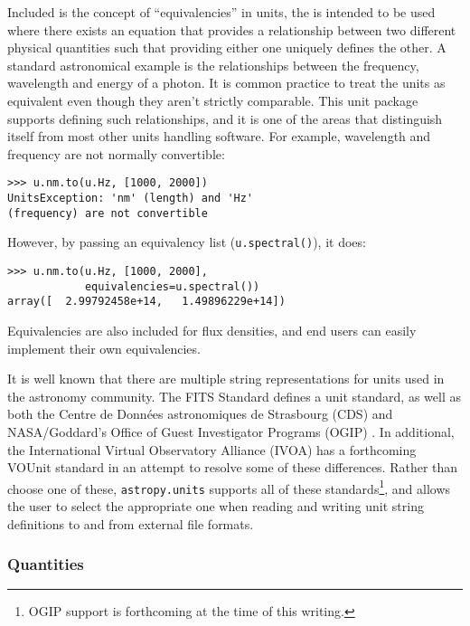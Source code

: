 \documentclass[traditabstract]{aa}
\begin{document}
Included is the concept of ``equivalencies'' in units, the is intended to be
used where there exists an equation that provides a relationship between two
different physical quantities such that providing either one uniquely defines
the other. A standard astronomical example is the relationships between the
frequency, wavelength and energy of a photon. It is common practice to treat
the units as equivalent even though they aren't strictly comparable. This unit
package supports defining such relationships, and it is one of the areas that
distinguish itself from most other units handling software. For example,
wavelength and frequency are not normally convertible:
\begin{verbatim}
>>> u.nm.to(u.Hz, [1000, 2000])
UnitsException: 'nm' (length) and 'Hz'
(frequency) are not convertible
\end{verbatim}
However, by passing an equivalency list (\texttt{u.spectral()}), it
does:
\begin{verbatim}
>>> u.nm.to(u.Hz, [1000, 2000],
            equivalencies=u.spectral())
array([  2.99792458e+14,   1.49896229e+14])
\end{verbatim}
Equivalencies are also included for flux densities, and end users can
easily implement their own equivalencies.


It is well known that there are multiple string representations for
units used in the astronomy community.  The FITS Standard
\cite{fits2008} defines a unit standard, as well as both the Centre de
Donn\'ees astronomiques de Strasbourg (CDS) \citep{ochsenbein2000cds}
and NASA/Goddard's Office of Guest Investigator Programs (OGIP)
\citep{george1995ogip}.  In additional, the International Virtual
Observatory Alliance (IVOA) has a forthcoming VOUnit standard
\citep{derriere2012vounit} in an attempt to resolve some of these
differences.  Rather than choose one of these, \texttt{astropy.units}
supports all of these standards\footnote{OGIP support is forthcoming
  at the time of this writing.}, and allows the user to select the
appropriate one when reading and writing unit string definitions to
and from external file formats.

\subsubsection{Quantities}
\end{document}
